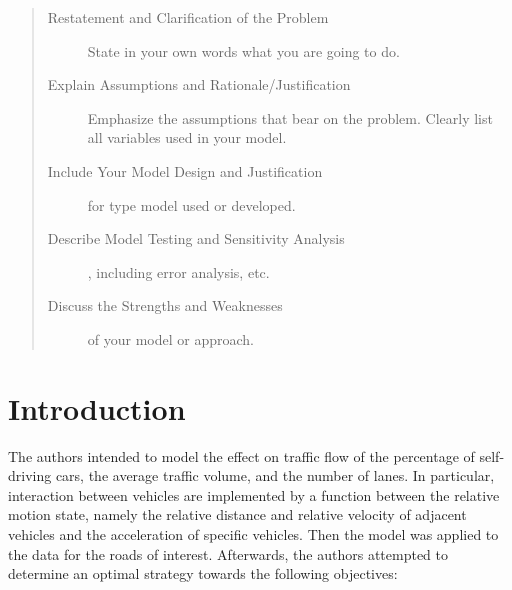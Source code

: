 \documentclass{icmmcm}
\begin{document}
\begin{summary}
\begin{quotation}
    \begin{description}
    \item[Restatement and Clarification of the Problem] State in
      your own words what you are going to do.
    \item[Explain Assumptions and Rationale/Justification]
      Emphasize the assumptions that bear on the problem. Clearly
      list all variables used in your model.
    \item[Include Your Model Design and Justification] for type
      model used or developed.
    \item[Describe Model Testing and Sensitivity Analysis],
      including error analysis, etc.
    \item[Discuss the Strengths and Weaknesses] of your model or
      approach.
  \end{description}
 \citep{comap-mcm-rules}
\end{quotation}

\end{summary}
 


\maketitle
\tableofcontents

 

\section{Introduction}%
\label{sec:introduction}

The authors intended to model the effect on traffic flow of the percentage of self-driving cars, the average traffic volume, and the number of lanes. In particular, interaction between vehicles are implemented by a function between the relative motion state, namely the relative distance and relative velocity of adjacent vehicles and the acceleration of specific vehicles. Then the model was applied to the data for the roads of interest. Afterwards, the authors attempted to determine an optimal strategy towards the following objectives:
\end{document}
